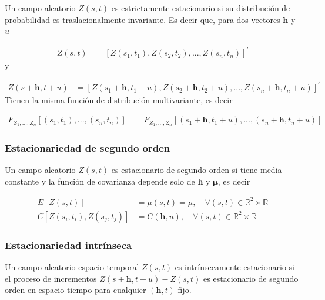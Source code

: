 \documentclass[
]{book}
\begin{document}
Un campo aleatorio \(Z(s,t)\) es estrictamente estacionario si su distribución de probabilidad es traslacionalmente invariante. Es decir que, para dos vectores \(\boldsymbol{h}\) y \(u\)

\[
\begin{align*}
Z(s,t)&=[Z(s_1,t_1), Z(s_2,t_2),...,Z(s_n,t_n)]^{'}
\end{align*}
\] y

\[
\begin{align*}
Z(s+\boldsymbol h,t+u)&=[Z(s_1+\boldsymbol h,t_1+u), Z(s_2+\boldsymbol h,t_2+u),...,Z(s_n+\boldsymbol h,t_n+u)]^{'}
\end{align*}
\] Tienen la misma función de distribución multivariante, es decir

\[
\begin{align*}
F_{Z_1,...,Z_n}[(s_1,t_1),...,(s_n,t_n)]&= F_{Z_1,...,Z_n}[(s_1+\boldsymbol h,t_1+ u),...,(s_n+\boldsymbol h,t_n+u)]
\end{align*}
\]

\hypertarget{estacionariedad-de-segundo-orden-1}{%
\subsubsection*{Estacionariedad de segundo orden}\label{estacionariedad-de-segundo-orden-1}}

Un campo aleatorio \(Z(s,t)\) es estacionario de segundo orden si tiene media constante y la función de covarianza depende solo de \(\boldsymbol h\) y \(\boldsymbol \mu\), es decir

\[
\begin{align*}
E[Z(s,t)]&=\mu(s,t)=\mu,\quad \forall (s,t)\in \mathbb{R}^2\times \mathbb{R} \\
C[Z(s_i,t_i),Z(s_j,t_j)]&=C(\boldsymbol h, u), \quad \forall(s,t) \in \mathbb{R}^2 \times \mathbb{R}
\end{align*}
\]

\hypertarget{estacionariedad-intruxednseca-1}{%
\subsubsection*{Estacionariedad intrínseca}\label{estacionariedad-intruxednseca-1}}

Un campo aleatorio espacio-temporal \(Z(s,t)\) es intrínsecamente estacionario si el proceso de incrementos \(Z(s+\boldsymbol h,t+u)-Z(s,t)\) es estacionario de segundo orden en espacio-tiempo para cualquier \((\boldsymbol h,t)\) fijo.
\end{document}
